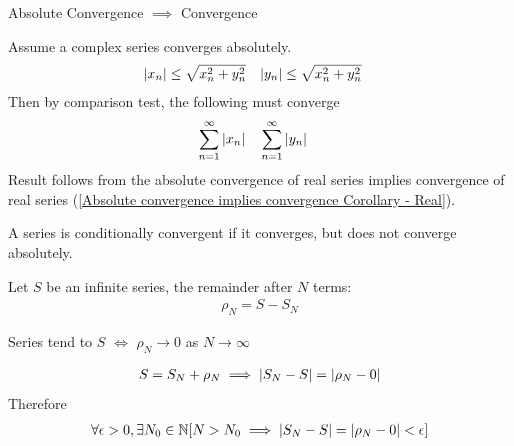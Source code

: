 \documentclass[12pt, english]{book}
\makeatletter
\renewenvironment{proof}[1][\proofname]{\par
	\pushQED{\qed}%
	\normalfont \topsep6\p@\@plus6\p@\relax
	\list{}{%
		\settowidth{\leftmargin}{\itshape\proofname:\hskip\labelsep}%
		\setlength{\labelwidth}{0pt}%
		\setlength{\itemindent}{-\leftmargin}%
	}%
	\item[\hskip\labelsep\itshape#1\@addpunct{:}]\ignorespaces
	}{ \popQED\endlist\@endpefalse}
\makeatother
\begin{document}
	\begin{corollary}
		\label{Absolute convergence implies convergence (Complex) Corollary - Complex}
		Absolute Convergence \(\implies\) Convergence
	\end{corollary}
	\begin{proof}
		Assume a complex series converges absolutely. 
		\begin{align*}
			\abs{x_n} &\leq \sqrt{x_n^2 + y_n^2} & \abs{y_n} &\leq \sqrt{x_n^2 + y_n^2}
		\end{align*}
		Then by comparison test, the following must converge
		\begin{align*}
			\sum_{n=1}^{\infty} \abs{x_n} &&& \sum_{n=1}^{\infty} \abs{y_n}
		\end{align*}
		Result follows from the absolute convergence of real series implies convergence of real series (\cref{Absolute convergence implies convergence Corollary - Real}). 
	\end{proof}

	\begin{definition}
		\label{Conditional Convergence Definition - Complex}
		A series is conditionally convergent if it converges, but does not converge absolutely. 
	\end{definition}

	\begin{definition}
		Let \(S\) be an infinite series, the remainder after \(N\) terms:
		\begin{align*}
			\rho_N = S - S_N
		\end{align*}
	\end{definition}

	\begin{corollary}
		Series tend to \(S\) \(\iff\) \(\rho_N \rightarrow 0\) as \(N \rightarrow \infty\)
	\end{corollary}
	\begin{proof}
		\begin{align*}
			S = S_N + \rho_N \implies \abs{S_N - S} = \abs{\rho_N - 0}
		\end{align*}
		{\color{Grey}
		Therefore
		\begin{align*}
			\forall \epsilon > 0, \exists N_0 \in \mathbb{N}
			[N > N_0 \implies \abs{S_N - S} = \abs{\rho_N - 0} < \epsilon]
		\end{align*}
		}
	\end{proof}
\end{document}
